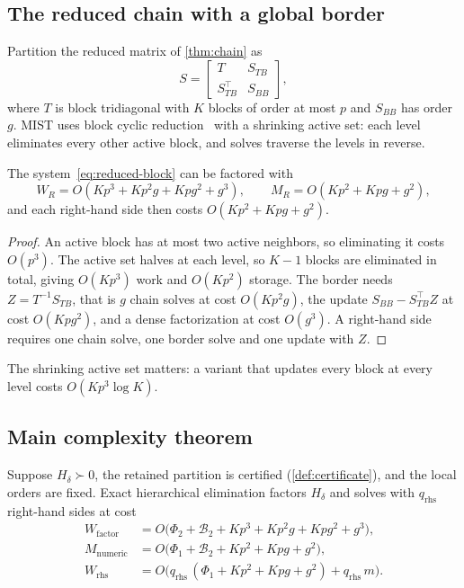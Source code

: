 \subsection{The reduced chain with a global border}

Partition the reduced matrix of \cref{thm:chain} as
\begin{equation}\label{eq:reduced-block}
S=\begin{bmatrix}T&S_{TB}\\S_{TB}^\top&S_{BB}\end{bmatrix},
\end{equation}
where $T$ is block tridiagonal with $K$ blocks of order at most $p$ and $S_{BB}$
has order $g$. MIST uses block cyclic reduction~\cite{hockney1965fast,heller1976some}
with a shrinking active set: each level eliminates every other active block, and
solves traverse the levels in reverse.

\begin{lemma}\label{lem:reduced}
The system~\eqref{eq:reduced-block} can be factored with
\begin{equation}\label{eq:reduced-cost}
W_R=O(Kp^3+Kp^2g+Kpg^2+g^3),\qquad M_R=O(Kp^2+Kpg+g^2),
\end{equation}
and each right-hand side then costs $O(Kp^2+Kpg+g^2)$.
\end{lemma}

\begin{proof}
An active block has at most two active neighbors, so eliminating it costs
$O(p^3)$. The active set halves at each level, so $K-1$ blocks are eliminated in
total, giving $O(Kp^3)$ work and $O(Kp^2)$ storage. The border needs
$Z=T^{-1}S_{TB}$, that is $g$ chain solves at cost $O(Kp^2g)$, the update
$S_{BB}-S_{TB}^\top Z$ at cost $O(Kpg^2)$, and a dense factorization at cost
$O(g^3)$. A right-hand side requires one chain solve, one border solve and one
update with $Z$.
\end{proof}

The shrinking active set matters: a variant that updates every block at every
level costs $O(Kp^3\log K)$.

\subsection{Main complexity theorem}

\begin{theorem}\label{thm:main}
Suppose $H_\delta\succ0$, the retained partition is certified
(\cref{def:certificate}), and the local orders are fixed. Exact hierarchical
elimination factors $H_\delta$ and solves with $q_{\mathrm{rhs}}$ right-hand sides
at cost
\begin{align}
W_{\mathrm{factor}}&=O\bigl(\Phi_2+\mathcal B_2+Kp^3+Kp^2g+Kpg^2+g^3\bigr),\label{eq:wfactor}\\
M_{\mathrm{numeric}}&=O\bigl(\Phi_1+\mathcal B_2+Kp^2+Kpg+g^2\bigr),\label{eq:mnum}\\
W_{\mathrm{rhs}}&=O\bigl(q_{\mathrm{rhs}}\,(\Phi_1+Kp^2+Kpg+g^2)+q_{\mathrm{rhs}}\,m\bigr).\label{eq:wrhs}
\end{align}
\end{theorem}

